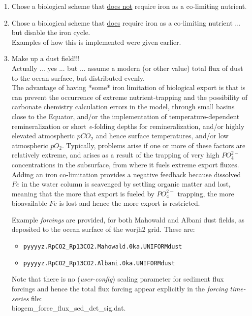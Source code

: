 \begin{enumerate}[noitemsep]
\vspace{1mm}
\item Chose a biological scheme that \uline{does not} require iron as a co-limiting nutrient.
\vspace{1mm}
\item Chose a biological scheme that \uline{does} require iron as a co-limiting nutrient ... but disable the iron cycle. 
\\Examples of how this is implemented were given earlier.
\item Make up a dust field!!!
\\Actually ... yes ... but ... assume a modern (or other value) total flux of dust to the ocean surface, but distributed evenly.
\\The advantage of having *some* iron limitation of biological export is that is can prevent the occurrence of extreme nutrient-trapping and the possibility of carbonate chemistry calculation errors in the model, through small basins close to the Equator, and/or the implementation of temperature-dependent remineralization or short \textit{e}-folding depths for  remineralization, and/or highly elevated atmospheric \(pCO_{2}\) and hence surface temperatures, and/or low atmospheric \(pO_{2}\). Typically, problems arise if one or more of these factors are relatively extreme, and arises as a result of the trapping of very high \(PO^{2-}_{4}\) concentrations in the subsurface, from where it fuels extreme export fluxes. Adding an iron co-limitation provides a negative feedback because dissolved \(Fe\) in the water column is scavenged by settling organic matter and lost, meaning that the more that export is fueled by \(PO^{2-}_{4}\) trapping, the more bioavailable \(Fe\) is lost and hence the more export is restricted.

\vspace{1mm}
Example \textit{forcings} are provided, for both Mahowald and Albani dust fields, as deposited to the  ocean surface of the \textsf{\footnotesize worjh2} grid. These are:
\vspace{1mm}
\begin{itemize}[noitemsep]
\item \texttt{\small pyyyyz.RpCO2\_Rp13CO2.Mahowald.0ka.UNIFORMdust}
\item \texttt{\small pyyyyz.RpCO2\_Rp13CO2.Albani.0ka.UNIFORMdust}
\end{itemize}
\vspace{1mm}
Note that there is no (\textit{user-config}) scaling parameter for sediment flux forcings and hence the total flux forcing appear explicitly in the \textit{forcing} \textit{time-series} file: 
\\\textsf{\footnotesize biogem\_force\_flux\_sed\_det\_sig.dat}.


\end{enumerate}
